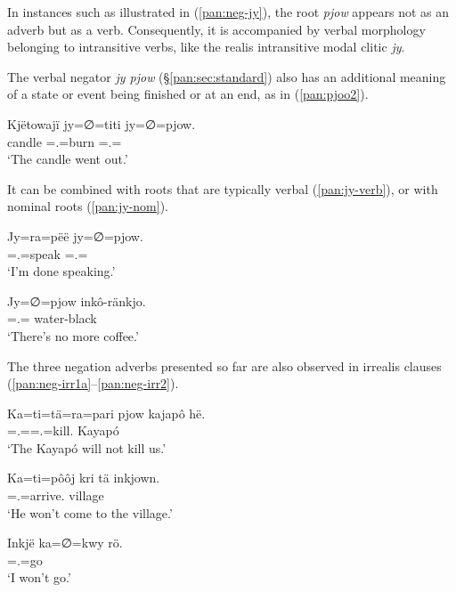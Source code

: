 \documentclass[output=paper,colorlinks,citecolor=brown,draft]{langscibook}
\begin{document}
In instances such as illustrated in (\ref{pan:neg-jy}), the root \textit{pjow} appears not as an adverb but as a verb. Consequently, it is accompanied by verbal morphology belonging to intransitive verbs, like the realis intransitive modal clitic \textit{jy}.

The verbal negator \textit{jy pjow} (\S\ref{pan:sec:standard}) also has an additional meaning of a state or event being finished or at an end, as in (\ref{pan:pjoo2}).

\ea\label{pan:pjoo2}
    \gll Kjëtowajï jy=∅=titi jy=∅=pjow. \\
    candle \Intr{}=\Tsg.\Abs{}=burn \Intr{}=\Tsg.\Abs{}=\Neg{} \\
    \glt `The candle went out.' \\
\z

It can be combined with roots that are typically verbal (\ref{pan:jy-verb}), or with nominal roots (\ref{pan:jy-nom}).

\ea\label{pan:jy-verb}%
    \gll Jy=ra=pëë jy=∅=pjow. \\
    \Intr{}=\Fsg.\Abs{}=speak \Intr{}=\Tsg.\Abs{}=\Neg{} \\
    \glt `I'm done speaking.'\\
\z

\ea\label{pan:jy-nom}%
    \gll Jy=∅=pjow inkô-ränkjo.  \\
    \Intr{}=\Tsg.\Abs{}=\Neg{} water-black \\
    \glt `There's no more coffee.' \\
\z

The three negation adverbs presented so far are also observed in irrealis clauses (\ref{pan:neg-irr1a}--\ref{pan:neg-irr2}).

\ea\label{pan:neg-irr1a}
    \gll Ka=ti=tä=ra=pari pjow kajapô hë. \\
    \Irr{}=\Ssg.\Irr{}=\Dir{}=\Fpl.\Abs{}=kill.\Plac{} \Neg{} Kayapó \Erg{}  \\
    \glt `The Kayapó will not kill us.' \\
\z

\ea\label{pan:neg-irr1b}
    \gll Ka=ti=pôôj kri tä inkjown. \\
    \Irr{}=\Tsg.\Irr{}=arrive.\Irr{} village \All{} \Neg{}  \\
    \glt `He won't come to the village.' \\
\z

\ea\label{pan:neg-irr2}
    \gll Inkjë ka=∅=kwy rö. \\
    \Fsg{} \Irr{}=\Fsg.\Irr{}=go \Neg{}  \\
    \glt `I won't go.' \\
\z
\end{document}
